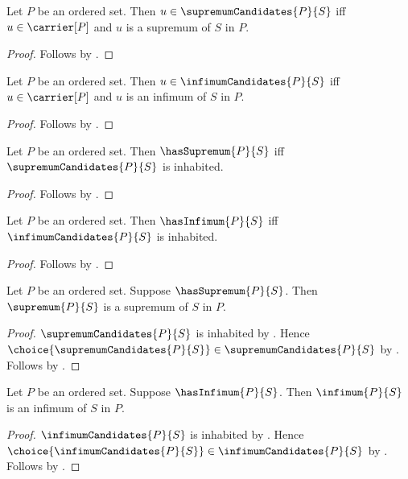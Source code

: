 \begin{proposition}\label{supremum_candidate_iff}
    Let $P$ be an ordered set.
    Then $u\in\supremumCandidates{P}{S}$ iff
        $u\in\carrier[P]$ and $u$ is a supremum of $S$ in $P$.
\end{proposition}
\begin{proof}
    Follows by .
\end{proof}

\begin{proposition}\label{infimum_candidate_iff}
    Let $P$ be an ordered set.
    Then $u\in\infimumCandidates{P}{S}$ iff
        $u\in\carrier[P]$ and $u$ is an infimum of $S$ in $P$.
\end{proposition}
\begin{proof}
    Follows by .
\end{proof}

\begin{proposition}\label{has_supremum_iff_candidates_inhabited}
    Let $P$ be an ordered set.
    Then $\hasSupremum{P}{S}$ iff
        $\supremumCandidates{P}{S}$ is inhabited.
\end{proposition}
\begin{proof}
    Follows by .
\end{proof}

\begin{proposition}\label{has_infimum_iff_candidates_inhabited}
    Let $P$ be an ordered set.
    Then $\hasInfimum{P}{S}$ iff
        $\infimumCandidates{P}{S}$ is inhabited.
\end{proposition}
\begin{proof}
    Follows by .
\end{proof}

\begin{proposition}\label{supremum_spec}
    Let $P$ be an ordered set.
    Suppose $\hasSupremum{P}{S}$.
    Then $\supremum{P}{S}$ is a supremum of $S$ in $P$.
\end{proposition}
\begin{proof}
    $\supremumCandidates{P}{S}$ is inhabited by
        .
    Hence $\choice{\supremumCandidates{P}{S}}
        \in\supremumCandidates{P}{S}$ by .
    Follows by .
\end{proof}

\begin{proposition}\label{infimum_spec}
    Let $P$ be an ordered set.
    Suppose $\hasInfimum{P}{S}$.
    Then $\infimum{P}{S}$ is an infimum of $S$ in $P$.
\end{proposition}
\begin{proof}
    $\infimumCandidates{P}{S}$ is inhabited by
        .
    Hence $\choice{\infimumCandidates{P}{S}}
        \in\infimumCandidates{P}{S}$ by .
    Follows by .
\end{proof}

